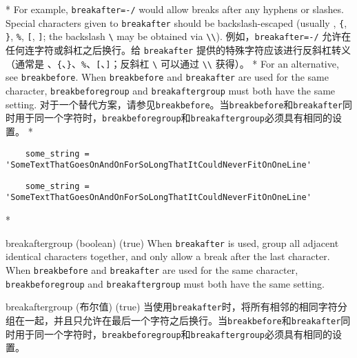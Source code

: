 \begin{paracol}{2}
\begin{optionlist}
\switchcolumn[0]*%
For example, \texttt{breakafter=-/} would allow breaks after any hyphens or slashes.  Special characters given to \texttt{breakafter} should be backslash-escaped (usually \texttt{\hashchar}, \texttt{\{}, \texttt{\}}, \texttt{\%}, \texttt{[}, \texttt{]}; the backslash \texttt{\textbackslash} may be obtained via \texttt{\textbackslash\textbackslash}).
\switchcolumn
例如，\texttt{breakafter=-/} 允许在任何连字符或斜杠之后换行。给 \texttt{breakafter} 提供的特殊字符应该进行反斜杠转义（通常是 \texttt{\hashchar}、\texttt{\{}、\texttt{\}}、\texttt{\%}、\texttt{[}、\texttt{]}；反斜杠 \texttt{\textbackslash} 可以通过 \texttt{\textbackslash\textbackslash} 获得）。
\switchcolumn[0]*%
For an alternative, see \texttt{breakbefore}.  When \texttt{breakbefore} and \texttt{breakafter} are used for the same character, \texttt{breakbeforegroup} and \texttt{breakaftergroup} must both have the same setting.
\switchcolumn
对于一个替代方案，请参见\texttt{breakbefore}。当\texttt{breakbefore}和\texttt{breakafter}同时用于同一个字符时，\texttt{breakbeforegroup}和\texttt{breakaftergroup}必须具有相同的设置。
\switchcolumn[0]*%
\begin{longexample}
    \begin{verbatim}
    some_string = 'SomeTextThatGoesOnAndOnForSoLongThatItCouldNeverFitOnOneLine'
    \end{verbatim}
\end{longexample}
\switchcolumn
\begin{longexample}
    \begin{verbatim}
    some_string = 'SomeTextThatGoesOnAndOnForSoLongThatItCouldNeverFitOnOneLine'
    \end{verbatim}
\end{longexample}
\switchcolumn[0]*%
\item[breakaftergroup] (boolean) (true)
When \texttt{breakafter} is used, group all adjacent identical characters together, and only allow a break after the last character.  When \texttt{breakbefore} and \texttt{breakafter} are used for the same character, \texttt{breakbeforegroup} and \texttt{breakaftergroup} must both have the same setting.
\switchcolumn
\item[breakaftergroup] (布尔值) (true)
当使用\texttt{breakafter}时，将所有相邻的相同字符分组在一起，并且只允许在最后一个字符之后换行。当\texttt{breakbefore}和\texttt{breakafter}同时用于同一个字符时，\texttt{breakbeforegroup}和\texttt{breakaftergroup}必须具有相同的设置。

\end{optionlist}
\end{paracol}
